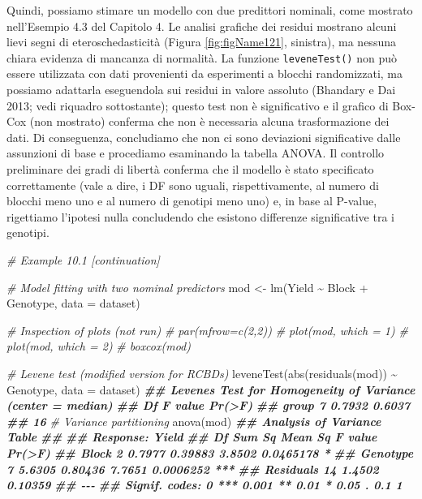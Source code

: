 \documentclass[
  12pt,
]{book}
\newenvironment{Shaded}{\begin{snugshade}}{\end{snugshade}}
\newcommand{\AttributeTok}[1]{\textcolor[rgb]{0.77,0.63,0.00}{#1}}
\newcommand{\CommentTok}[1]{\textcolor[rgb]{0.56,0.35,0.01}{\textit{#1}}}
\newcommand{\DocumentationTok}[1]{\textcolor[rgb]{0.56,0.35,0.01}{\textbf{\textit{#1}}}}
\newcommand{\FunctionTok}[1]{\textcolor[rgb]{0.00,0.00,0.00}{#1}}
\newcommand{\NormalTok}[1]{#1}
\newcommand{\OtherTok}[1]{\textcolor[rgb]{0.56,0.35,0.01}{#1}}
\newcommand{\SpecialCharTok}[1]{\textcolor[rgb]{0.00,0.00,0.00}{#1}}
\begin{document}
Quindi, possiamo stimare un modello con due predittori nominali, come mostrato nell'Esempio 4.3 del Capitolo 4. Le analisi grafiche dei residui mostrano alcuni lievi segni di eteroschedasticità (Figura \ref{fig:figName121}, sinistra), ma nessuna chiara evidenza di mancanza di normalità. La funzione \texttt{leveneTest()} non può essere utilizzata con dati provenienti da esperimenti a blocchi randomizzati, ma possiamo adattarla eseguendola sui residui in valore assoluto (Bhandary e Dai 2013; vedi riquadro sottostante); questo test non è significativo e il grafico di Box-Cox (non mostrato) conferma che non è necessaria alcuna trasformazione dei dati. Di conseguenza, concludiamo che non ci sono deviazioni significative dalle assunzioni di base e procediamo esaminando la tabella ANOVA. Il controllo preliminare dei gradi di libertà conferma che il modello è stato specificato correttamente (vale a dire, i DF sono uguali, rispettivamente, al numero di blocchi meno uno e al numero di genotipi meno uno) e, in base al P-value, rigettiamo l'ipotesi nulla concludendo che esistono differenze significative tra i genotipi.

\begin{Shaded}
\begin{Highlighting}[]
\CommentTok{\# Example 10.1 [continuation]}

\CommentTok{\# Model fitting with two nominal predictors}
\NormalTok{mod }\OtherTok{\textless{}{-}} \FunctionTok{lm}\NormalTok{(Yield }\SpecialCharTok{\textasciitilde{}}\NormalTok{ Block }\SpecialCharTok{+}\NormalTok{ Genotype, }\AttributeTok{data =}\NormalTok{ dataset)}

\CommentTok{\# Inspection of plots (not run)}
\CommentTok{\# par(mfrow=c(2,2))}
\CommentTok{\# plot(mod, which = 1)}
\CommentTok{\# plot(mod, which = 2)}
\CommentTok{\# boxcox(mod)}

\CommentTok{\# Levene test (modified version for RCBDs)}
\FunctionTok{leveneTest}\NormalTok{(}\FunctionTok{abs}\NormalTok{(}\FunctionTok{residuals}\NormalTok{(mod)) }\SpecialCharTok{\textasciitilde{}}\NormalTok{ Genotype, }\AttributeTok{data =}\NormalTok{ dataset)}
\DocumentationTok{\#\# Levene\textquotesingle{}s Test for Homogeneity of Variance (center = median)}
\DocumentationTok{\#\#       Df F value Pr(\textgreater{}F)}
\DocumentationTok{\#\# group  7  0.7932 0.6037}
\DocumentationTok{\#\#       16}
\CommentTok{\# Variance partitioning}
\FunctionTok{anova}\NormalTok{(mod)}
\DocumentationTok{\#\# Analysis of Variance Table}
\DocumentationTok{\#\# }
\DocumentationTok{\#\# Response: Yield}
\DocumentationTok{\#\#           Df Sum Sq Mean Sq F value    Pr(\textgreater{}F)    }
\DocumentationTok{\#\# Block      2 0.7977 0.39883  3.8502 0.0465178 *  }
\DocumentationTok{\#\# Genotype   7 5.6305 0.80436  7.7651 0.0006252 ***}
\DocumentationTok{\#\# Residuals 14 1.4502 0.10359                      }
\DocumentationTok{\#\# {-}{-}{-}}
\DocumentationTok{\#\# Signif. codes:  0 \textquotesingle{}***\textquotesingle{} 0.001 \textquotesingle{}**\textquotesingle{} 0.01 \textquotesingle{}*\textquotesingle{} 0.05 \textquotesingle{}.\textquotesingle{} 0.1 \textquotesingle{} \textquotesingle{} 1}
\end{Highlighting}
\end{Shaded}
\end{document}
